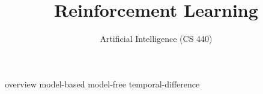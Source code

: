\documentclass{../../shared/latex/notes}
\title{Reinforcement Learning}
\author{Artificial Intelligence (CS 440)}
\begin{document}
  \maketitle
  \tableofcontents

  {overview}
  {model-based}
  {model-free}
  {temporal-difference}
\end{document}
